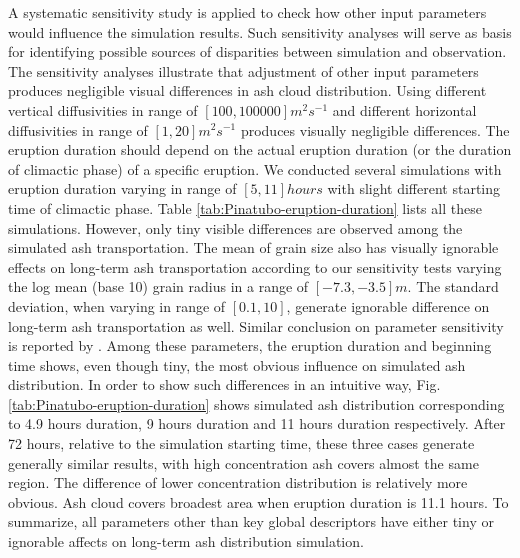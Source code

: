 A systematic sensitivity study is applied to check how other input parameters would influence the simulation results. Such sensitivity analyses will serve as basis for identifying possible sources of disparities between simulation and observation.
The sensitivity analyses illustrate that adjustment of other input parameters produces negligible visual differences in ash cloud distribution. Using different vertical diffusivities in range of $[100, 100000] m^2s^{-1} $ and different horizontal diffusivities in range of $[1, 20] m^2s^{-1}$ produces visually negligible differences. 
The eruption duration should depend on the actual eruption duration (or the duration of climactic phase) of a specific eruption. We conducted several simulations with eruption duration varying in range of $[5, 11] hours$ with slight different starting time of climactic phase. Table \ref{tab:Pinatubo-eruption-duration} lists all these simulations. However, only tiny visible differences are observed among the simulated ash transportation. The mean of grain size also has visually ignorable effects on long-term ash transportation according to our sensitivity tests varying the log mean (base 10) grain radius in a range of $[-7.3, -3.5] m$. 
The standard deviation, when varying in range of $[0.1, 10]$, generate ignorable difference on long-term ash transportation as well. Similar conclusion on parameter sensitivity is reported by \citet{fero2008simulation}.
Among these parameters, the eruption duration and beginning time shows, even though tiny, the most obvious influence on simulated ash distribution. In order to show such differences in an intuitive way, Fig. \ref{tab:Pinatubo-eruption-duration} shows simulated ash distribution corresponding to 4.9 hours duration, 9 hours duration and 11 hours duration respectively. After 72 hours, relative to the simulation starting time, these three cases generate generally similar results, with high concentration ash covers almost the same region. The difference of lower concentration distribution is relatively more obvious. Ash cloud covers broadest area when eruption duration is 11.1 hours. To summarize, all parameters other than key global descriptors have either tiny or ignorable affects on long-term ash distribution simulation.

